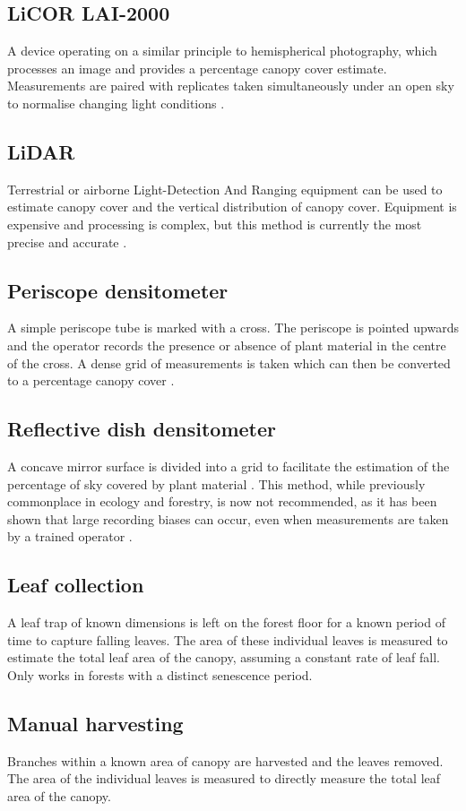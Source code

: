 \documentclass[11pt,a4paper]{article}
\begin{document}
\subsection{LiCOR LAI-2000}

A device operating on a similar principle to hemispherical photography, which processes an image and provides a percentage canopy cover estimate. Measurements are paired with replicates taken simultaneously under an open sky to normalise changing light conditions \citep{Gower1991}.

\subsection{LiDAR}

Terrestrial or airborne Light-Detection And Ranging equipment can be used to estimate canopy cover and the vertical distribution of canopy cover. Equipment is expensive and processing is complex, but this method is currently the most precise and accurate \citep{Seidel2011}.

\subsection{Periscope densitometer}

A simple periscope tube is marked with a cross. The periscope is pointed upwards and the operator records the presence or absence of plant material in the centre of the cross. A dense grid of measurements is taken which can then be converted to a percentage canopy cover \citep{GRS}.

\subsection{Reflective dish densitometer}

A concave mirror surface is divided into a grid to facilitate the estimation of the percentage of sky covered by plant material \citep{Lemmon1956}. This method, while previously commonplace in ecology and forestry, is now not recommended, as it has been shown that large recording biases can occur, even when measurements are taken by a trained operator \citep{Korhonen2006}.

\subsection{Leaf collection}

A leaf trap of known dimensions is left on the forest floor for a known period of time to capture falling leaves. The area of these individual leaves is measured to estimate the total leaf area of the canopy, assuming a constant rate of leaf fall. Only works in forests with a distinct senescence period.

\subsection{Manual harvesting}

Branches within a known area of canopy are harvested and the leaves removed. The area of the individual leaves is measured to directly measure the total leaf area of the canopy.

\printbibliography
\end{document}
